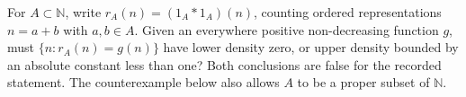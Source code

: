 For $A\subset\mathbb N$, write $r_A(n)=(1_A*1_A)(n)$, counting ordered representations $n=a+b$ with $a,b\in A$. Given an everywhere positive non-decreasing function $g$, must $\{n:r_A(n)=g(n)\}$ have lower density zero, or upper density bounded by an absolute constant less than one? Both conclusions are false for the recorded statement. The counterexample below also allows $A$ to be a proper subset of $\mathbb N$.
